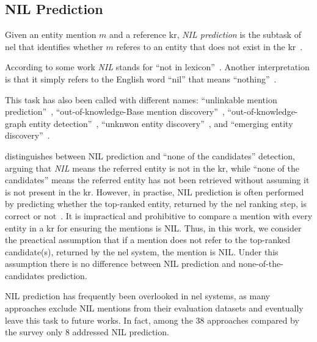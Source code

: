 \subsection{NIL Prediction}

\begin{definition}
    Given an entity mention $m$ and a reference \ac{kr}, \emph{NIL prediction} is the subtask of \acl{nel} that identifies whether $m$ referes to an entity that does not exist in the \ac{kr}~\cite{entity_linking_with_kb_2015}. 
\end{definition}

According to some work \emph{NIL} stands for ``not in lexicon''~\cite{ILIEVSKI2020100565}. Another interpretation is that it simply refers to the English word ``nil'' that means ``nothing''~\cite{cambridge_nil}.

This task has also been called with different names: ``unlinkable mention prediction''~\cite{entity_linking_with_kb_2015}, ``out-of-knowledge-Base mention discovery''~\cite{dong_reveal_the_unknown_2023}, ``out-of-knowledge-graph entity detection''~\cite{moller2024entity}, ``unknwon entity discovery''~\cite{kassner-etal-2022-edin}, and ``emerging entity discovery''~\cite{hoffart_discovering_emergin_entities_2014}.

\textcite{zhou-etal-2024-gendecider} distinguishes between NIL prediction and ``none of the candidates'' detection, arguing that \emph{NIL} means the referred entity is not in the \ac{kr}, while ``none of the candidates'' means the referred entity has not been retrieved without assuming it is not present in the \ac{kr}. However, in practise, NIL prediction is often performed by predicting whether the top-ranked entity, returned by the \ac{nel} ranking step, is correct or not~\cite{entity_linking_with_kb_2015}. It is impractical and prohibitive to compare a mention with every entity in a \ac{kr} for ensuring the mentions is NIL. Thus, in this work, we consider the preactical assumption that if a mention does not refer to the top-ranked candidate(s), returned by the \ac{nel} system, the mention is NIL. Under this assumption there is no difference between NIL prediction and none-of-the-candidates prediction.

NIL prediction has frequently been overlooked in \ac{nel}
systems, as many approaches exclude NIL mentions from their evaluation datasets and
eventually leave this task to future works. In fact, among the 38 approaches
compared by the survey \textcite{Sevgili2022NeuralEL} only 8 addressed NIL prediction.

